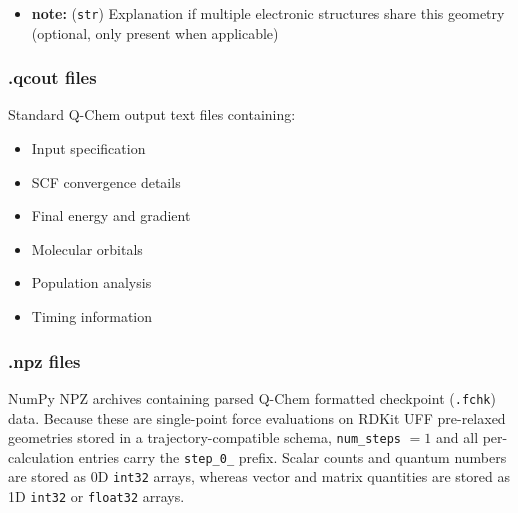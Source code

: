 \documentclass[fleqn,10pt]{article}
\begin{document}
\begin{itemize}
\item \textbf{note:} (\texttt{str}) Explanation if multiple electronic structures share this geometry (optional, only present when applicable)
\end{itemize}

\subsubsection*{.qcout files}

Standard Q-Chem output text files containing:
\begin{itemize}
\item Input specification
\item SCF convergence details
\item Final energy and gradient
\item Molecular orbitals
\item Population analysis
\item Timing information
\end{itemize}

\subsubsection*{.npz files}

NumPy NPZ archives containing parsed Q-Chem formatted checkpoint (\texttt{.fchk}) data. Because these are single-point force evaluations on RDKit UFF pre-relaxed geometries stored in a trajectory-compatible schema, \texttt{num\_\allowbreak{}steps} $=1$ and all per-calculation entries carry the \texttt{step\_\allowbreak{}0\_\allowbreak{}} prefix. Scalar counts and quantum numbers are stored as 0D \texttt{int32} arrays, whereas vector and matrix quantities are stored as 1D \texttt{int32} or \texttt{float32} arrays.
\end{document}

